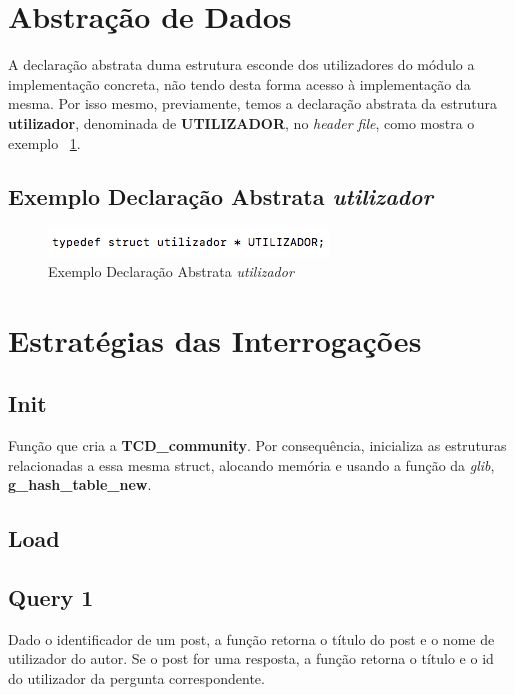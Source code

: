 \documentclass[a4paper]{article}
\begin{document}
\section{Abstração de Dados}

A declaração abstrata duma estrutura esconde dos utilizadores do módulo a
implementação concreta, não tendo desta forma acesso à implementação
da mesma. Por isso mesmo, previamente, temos a declaração abstrata da estrutura 
\textbf{utilizador}, denominada de \textbf{UTILIZADOR}, 
no \textit{header file}, como mostra o exemplo ~\ref{img:declaracao_utilizador}.

\subsection{Exemplo Declaração Abstrata \textit{utilizador}}
\begin{figure}[ht]
\centering
\includegraphics[scale=0.50]{image_declaracao_utilizador}
\caption{Exemplo Declaração Abstrata \textit{utilizador}}
\label{img:declaracao_utilizador}
\end{figure}

\section{Estratégias das Interrogações}
\label{sec:estrategias}

\subsection{Init}

Função que cria a \textbf{TCD\_community}. Por consequência, inicializa
as estruturas relacionadas a essa mesma struct, alocando memória e usando
a função da \textit{glib}, \textbf{g\_hash\_table\_new}.

\subsection{Load}

\subsection{Query 1}

Dado o identificador de um post, a função retorna o título do post 
e o nome de utilizador do autor. Se o post for uma resposta, a função
retorna o título e o id do utilizador da pergunta correspondente.
\end{document}
